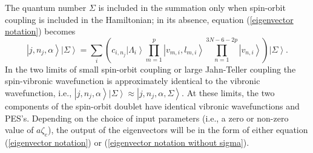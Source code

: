 \documentclass{article}
\begin{document}
The quantum number $\Sigma $ is
included in the summation only when spin-orbit coupling is included in the Hamiltonian;
in its absence, equation (\ref{eigenvector notation}) becomes
\begin{equation}
\left| j,n_{j},\alpha \right\rangle \left| \Sigma \right\rangle =
\sum_{i}\left( c_{i,n_{j} }\left| \Lambda _{i}\right\rangle 
\prod\limits_{m=1}^{p}\left| v_{m,i},l_{m,i}\right\rangle  
\prod\limits_{n=1}^{3N - 6 - 2p}\left| v_{n,i}\right\rangle
\right) 
\left| \Sigma \right\rangle . \label{eigenvector notation without sigma}
\end{equation}
In the two limits of small spin-orbit coupling or large Jahn-Teller coupling
the spin-vibronic wavefunction is approximately identical to the
vibronic wavefunction, i.e.,  
$\left| j,n_{j},\alpha \right\rangle \left| \Sigma \right\rangle \approx 
\left| j,n_{j},\alpha ,\Sigma \right\rangle $.
At these limits, the two components of the spin-orbit doublet have
identical vibronic wavefunctions and PES's. Depending on the choice of
input parameters (i.e., a zero or non-zero value of $a\zeta _e$), the
output of the eigenvectors will be in the form of either equation
(\ref{eigenvector notation}) or (\ref{eigenvector notation without sigma}).
\end{document}
